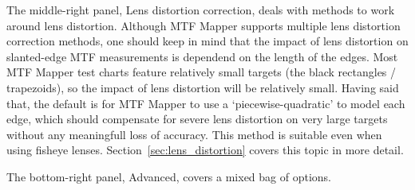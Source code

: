 \documentclass[a4paper]{article}
\begin{document}
The middle-right panel, \textsf{Lens distortion correction}, deals with
methods to work around lens distortion. Although MTF Mapper supports
multiple lens distortion correction methods, one should keep in mind that
the impact of lens distortion on slanted-edge MTF measurements is 
dependend on the length of the edges. Most MTF Mapper test charts feature
relatively small targets (the black rectangles / trapezoids), so the impact
of lens distortion will be relatively small. Having said that, the default
is for MTF Mapper to use a `piecewise-quadratic' to model each edge, which
should compensate for severe lens distortion on very large targets without
any meaningfull loss of accuracy. This method is suitable even when using
fisheye lenses. Section~\ref{sec:lens_distortion} covers this topic in more
detail.

The bottom-right panel, \textsf{Advanced}, covers a mixed bag of options.
\end{document}
